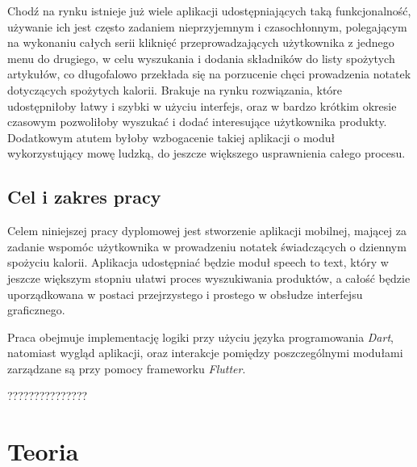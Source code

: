 \documentclass[12pt, a4paper]{article}
\begin{document}
\begin{sloppypar}
{{    Chodź na rynku istnieje już wiele aplikacji udostępniających taką funkcjonalność,
    używanie ich jest często zadaniem nieprzyjemnym i czasochłonnym, polegającym
    na wykonaniu całych serii kliknięć przeprowadzających użytkownika z jednego menu
    do drugiego, w celu wyszukania i dodania składników do listy spożytych artykułów,
    co długofalowo przekłada się na porzucenie chęci prowadzenia notatek dotyczących
    spożytych kalorii. 
    Brakuje na rynku rozwiązania, które udostępniłoby łatwy i szybki
    w użyciu interfejs, oraz w bardzo krótkim okresie czasowym pozwoliłoby wyszukać 
    i dodać interesujące użytkownika produkty. Dodatkowym atutem byłoby wzbogacenie
    takiej aplikacji o moduł wykorzystujący mowę ludzką, do jeszcze większego 
    usprawnienia całego procesu.
  }
  \subsection{Cel i zakres pracy}
  {
    Celem niniejszej pracy dyplomowej jest stworzenie aplikacji mobilnej, mającej 
    za zadanie wspomóc użytkownika w prowadzeniu notatek świadczących o dziennym
    spożyciu kalorii. Aplikacja udostępniać będzie moduł speech to text,
    który w jeszcze większym stopniu ułatwi proces wyszukiwania produktów, a całość
    będzie uporządkowana w postaci przejrzystego i prostego w obsłudze interfejsu
    graficznego.

    Praca obejmuje implementację logiki przy użyciu języka programowania \emph{Dart},
    natomiast wygląd aplikacji, oraz interakcje pomiędzy poszczególnymi modułami
    zarządzane są przy pomocy frameworku \emph{Flutter}.

    \color{red} ???????????????
  }

}

\section{Teoria}
{
}
\end{sloppypar}
\end{document}

